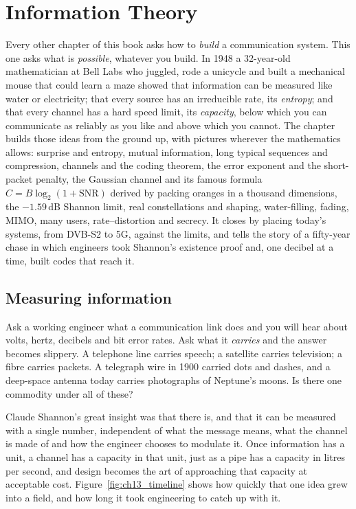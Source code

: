 \chapter{Information Theory}
\label{ch:infotheory}

\begin{chapterintro}
Every other chapter of this book asks how to \emph{build} a communication system. This one asks
what is \emph{possible}, whatever you build. In 1948 a 32-year-old mathematician at Bell Labs who
juggled, rode a unicycle and built a mechanical mouse that could learn a maze showed that
information can be measured like water or electricity; that every source has an irreducible
rate, its \emph{entropy}; and that every channel has a hard speed limit, its \emph{capacity},
below which you can communicate as reliably as you like and above which you cannot. The chapter
builds those ideas from the ground up, with pictures wherever the mathematics allows: surprise
and entropy, mutual information, long typical sequences and compression, channels and the
coding theorem, the error exponent and the short-packet penalty, the Gaussian channel and its
famous formula $C=B\log_2(1+\mathrm{SNR})$ derived by packing oranges in a thousand
dimensions, the $-1.59$\,dB Shannon limit, real constellations and shaping, water-filling,
fading, MIMO, many users, rate--distortion and secrecy. It closes by placing today's systems,
from DVB-S2 to 5G, against the limits, and tells the story of a fifty-year chase in which
engineers took Shannon's existence proof and, one decibel at a time, built codes that reach it.
\end{chapterintro}

\section{Measuring information}
\label{sec:ch13:intro}

Ask a working engineer what a communication link does and you will hear about volts, hertz,
decibels and bit error rates. Ask what it \emph{carries} and the answer becomes slippery. A
telephone line carries speech; a satellite carries television; a fibre carries packets. A
telegraph wire in 1900 carried dots and dashes, and a deep-space antenna today carries
photographs of Neptune's moons. Is there one commodity under all of these?

Claude Shannon's great insight was that there is, and that it can be measured with a single
number, independent of what the message means, what the channel is made of and how the engineer
chooses to modulate it. Once information has a unit, a channel has a capacity in that unit, just
as a pipe has a capacity in litres per second, and design becomes the art of approaching that
capacity at acceptable cost. Figure~\ref{fig:ch13_timeline} shows how quickly that one idea grew
into a field, and how long it took engineering to catch up with it.

